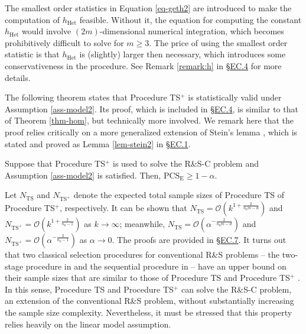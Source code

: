 \documentclass[ijoc,nonblindrev]{informs3}
\def\PCSE{\mathrm{PCS}_{\mathrm{E}}}
\def\hhet{h_{\mathrm{Het}}}
\begin{document}
\begin{remark}
The smallest order statistics in Equation \eqref{eq-geth2} are introduced to make the computation of $\hhet$ feasible.
Without it, the equation for computing the constant $\hhet$ would involve $(2m)$-dimensional numerical integration, which becomes prohibitively difficult to solve for $m\geq 3$.
The price of using the smallest order statistic is that $\hhet$ is (slightly) larger then necessary, which introduces some  conservativeness in the procedure.
See Remark \ref{remark:h} in \S\hyperlink{EC.4}{EC.4} for more details.
\end{remark}


The following theorem states that Procedure TS$^+$ is statistically valid under Assumption \ref{ass-model2}.
Its proof, which is included in \S\hyperlink{EC.4}{EC.4}, is similar to that of Theorem \ref{thm-hom}, but technically more involved.
We remark here that the proof relies critically on a more generalized extension of Stein's lemma \citep{stein1945},
which is stated and proved as Lemma \ref{lem-stein2} in \S\hyperlink{EC.1}{EC.1}.

\begin{theorem} \label{thm-het}
Suppose that Procedure TS$^+$ is used to solve the R\&S-C problem and Assumption \ref{ass-model2} is satisfied. Then,  $\PCSE \geq 1-\alpha$.\end{theorem}


\begin{remark}
Let $N_{\text{TS}}$ and $N_{\text{TS}^+}$ denote the expected total sample sizes of Procedure TS of Procedure TS$^+$, respectively.
It can be shown that
$N_{\text{TS}}=\mathcal{O}(k^{1+\frac{2}{n_0m-d}})$ and
$N_{\text{TS}^+}= \mathcal{O}(k^{1+\frac{2}{n_0-1}})$
as $k\to\infty$;
meanwhile, $N_{\text{TS}}=\mathcal{O}(\alpha^{-\frac{2}{n_0m-d}})$ and $N_{\text{TS}^+}= \mathcal{O}(\alpha^{-\frac{2}{n_0-1}})$ as  $\alpha\to 0$.
The proofs are provided in  \S\hyperlink{EC.7}{EC.7}.
It turns out that two classical selection procedures for conventional R\&S problems -- the two-stage procedure in \cite{rinott1978} and the sequential procedure in \cite{kim2001} -- have an upper bound on their sample sizes that are similar to those of Procedure TS and Procedure TS$^+$ \cite[Lemma 4]{zhong2020}.
In this sense, Procedure TS and Procedure TS$^+$ can solve the R\&S-C problem, an extension of the conventional R\&S problem, without substantially increasing the sample size complexity.
Nevertheless, it must be stressed that this property relies heavily on the linear model assumption.
\end{remark}
\end{document}

